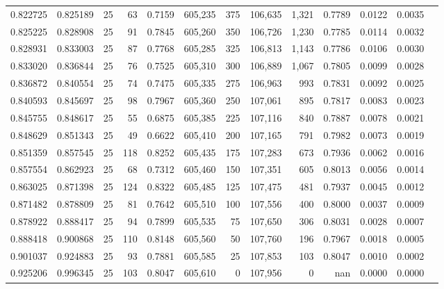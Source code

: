 \begin{tabular}{rrrrrrrrrrrrr}
0.822725 & 0.825189 &    25 &  63 &                                     0.7159 & 605,235 &     375 & 106,635 &   1,321 & 0.7789 & 0.0122 & 0.0035 \\
0.825225 & 0.828908 &    25 &  91 &                                     0.7845 & 605,260 &     350 & 106,726 &   1,230 & 0.7785 & 0.0114 & 0.0032 \\
0.828931 & 0.833003 &    25 &  87 &                                     0.7768 & 605,285 &     325 & 106,813 &   1,143 & 0.7786 & 0.0106 & 0.0030 \\
0.833020 & 0.836844 &    25 &  76 &                                     0.7525 & 605,310 &     300 & 106,889 &   1,067 & 0.7805 & 0.0099 & 0.0028 \\
0.836872 & 0.840554 &    25 &  74 &                                     0.7475 & 605,335 &     275 & 106,963 &     993 & 0.7831 & 0.0092 & 0.0025 \\
0.840593 & 0.845697 &    25 &  98 &                                     0.7967 & 605,360 &     250 & 107,061 &     895 & 0.7817 & 0.0083 & 0.0023 \\
0.845755 & 0.848617 &    25 &  55 &                                     0.6875 & 605,385 &     225 & 107,116 &     840 & 0.7887 & 0.0078 & 0.0021 \\
0.848629 & 0.851343 &    25 &  49 &                                     0.6622 & 605,410 &     200 & 107,165 &     791 & 0.7982 & 0.0073 & 0.0019 \\
0.851359 & 0.857545 &    25 & 118 &                                     0.8252 & 605,435 &     175 & 107,283 &     673 & 0.7936 & 0.0062 & 0.0016 \\
0.857554 & 0.862923 &    25 &  68 &                                     0.7312 & 605,460 &     150 & 107,351 &     605 & 0.8013 & 0.0056 & 0.0014 \\
0.863025 & 0.871398 &    25 & 124 &                                     0.8322 & 605,485 &     125 & 107,475 &     481 & 0.7937 & 0.0045 & 0.0012 \\
0.871482 & 0.878809 &    25 &  81 &                                     0.7642 & 605,510 &     100 & 107,556 &     400 & 0.8000 & 0.0037 & 0.0009 \\
0.878922 & 0.888417 &    25 &  94 &                                     0.7899 & 605,535 &      75 & 107,650 &     306 & 0.8031 & 0.0028 & 0.0007 \\
0.888418 & 0.900868 &    25 & 110 &                                     0.8148 & 605,560 &      50 & 107,760 &     196 & 0.7967 & 0.0018 & 0.0005 \\
0.901037 & 0.924883 &    25 &  93 &                                     0.7881 & 605,585 &      25 & 107,853 &     103 & 0.8047 & 0.0010 & 0.0002 \\
0.925206 & 0.996345 &    25 & 103 &                                     0.8047 & 605,610 &       0 & 107,956 &       0 &    nan & 0.0000 & 0.0000 \\
\bottomrule
\end{tabular}
